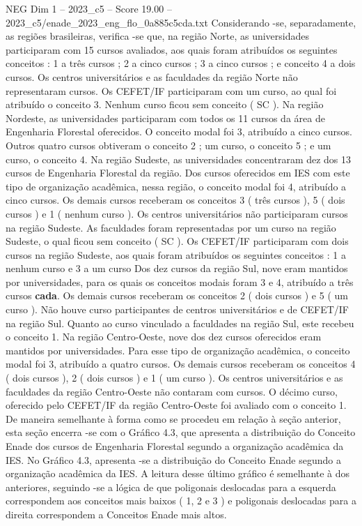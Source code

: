 \begin{textsample}{NEG Dim 1 – 2023\_c5 – Score 19.00 – 2023\_c5/enade\_2023\_eng\_flo\_0a885c5cda.txt}
Considerando -se, separadamente, as regiões brasileiras, verifica -se que, na região Norte, as universidades participaram com 15 cursos avaliados, aos quais foram atribuídos os seguintes conceitos : 1 a três cursos ; 2 a cinco cursos ; 3 a cinco cursos ; e conceito 4 a dois cursos.
Os centros universitários e as faculdades da região Norte não representaram cursos.
Os CEFET/IF participaram com um curso, ao qual foi atribuído o conceito 3.
Nenhum curso ficou sem conceito ( SC ).
Na região Nordeste, as universidades participaram com todos os 11 cursos da área de Engenharia Florestal oferecidos.
O conceito modal foi 3, atribuído a cinco cursos.
Outros quatro cursos obtiveram o conceito 2 ; um curso, o conceito 5 ; e um curso, o conceito 4.
Na região Sudeste, as universidades concentraram dez dos 13 cursos de Engenharia Florestal da região.
Dos cursos oferecidos em IES com este tipo de organização acadêmica, nessa região, o conceito modal foi 4, atribuído a cinco cursos.
Os demais cursos receberam os conceitos 3 ( três cursos ), 5 ( dois cursos ) e 1 ( nenhum curso ).
Os centros universitários não participaram cursos na região Sudeste.
As faculdades foram representadas por um curso na região Sudeste, o qual ficou sem conceito ( SC ).
Os CEFET/IF participaram com dois cursos na região Sudeste, aos quais foram atribuídos os seguintes conceitos : 1 a nenhum curso e 3 a um curso Dos dez cursos da região Sul, nove eram mantidos por universidades, para os quais os conceitos modais foram 3 e 4, atribuído a três cursos \textbf{cada}.
Os demais cursos receberam os conceitos 2 ( dois cursos ) e 5 ( um curso ).
Não houve curso participantes de centros universitários e de CEFET/IF na região Sul.
Quanto ao curso vinculado a faculdades na região Sul, este recebeu o conceito 1.
Na região Centro-Oeste, nove dos dez cursos oferecidos eram mantidos por universidades.
Para esse tipo de organização acadêmica, o conceito modal foi 3, atribuído a quatro cursos.
Os demais cursos receberam os conceitos 4 ( dois cursos ), 2 ( dois cursos ) e 1 ( um curso ).
Os centros universitários e as faculdades da região Centro-Oeste não contaram com cursos.
O décimo curso, oferecido pelo CEFET/IF da região Centro-Oeste foi avaliado com o conceito 1.
De maneira semelhante à forma como se procedeu em relação à seção anterior, esta seção encerra -se com o Gráfico 4.3, que apresenta a distribuição do Conceito Enade dos cursos de Engenharia Florestal segundo a organização acadêmica da IES.
No Gráfico 4.3, apresenta -se a distribuição do Conceito Enade segundo a organização acadêmica da IES.
A leitura desse último gráfico é semelhante à dos anteriores, seguindo -se a lógica de que poligonais deslocadas para a esquerda correspondem aos conceitos mais baixos ( 1, 2 e 3 ) e poligonais deslocadas para a direita correspondem a Conceitos Enade mais altos.

\end{textsample}
